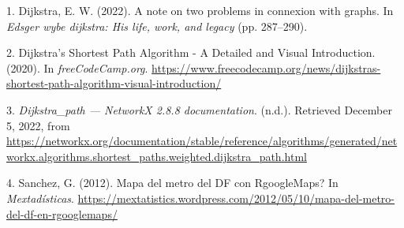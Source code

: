 \documentclass[
]{article}
\newlength{\cslhangindent}
\newlength{\cslentryspacingunit} %
\newenvironment{CSLReferences}[2] %
 {%
  \setlength{\parindent}{0pt}
  \ifodd #1
  \let\oldpar\par
  \def\par{\hangindent=\cslhangindent\oldpar}
  \fi
  \setlength{\parskip}{#2\cslentryspacingunit}
 }%
 {}
\begin{document}
\hypertarget{refs}{}
\begin{CSLReferences}{1}{0}
\leavevmode{}%
1. Dijkstra, E. W. (2022). A note on two problems in connexion with
graphs. In \emph{Edsger wybe dijkstra: His life, work, and legacy} (pp.
287--290).

\leavevmode{}%
2. Dijkstra's {Shortest} {Path} {Algorithm} - {A} {Detailed} and
{Visual} {Introduction}. (2020). In \emph{freeCodeCamp.org}.
\url{https://www.freecodecamp.org/news/dijkstras-shortest-path-algorithm-visual-introduction/}

\leavevmode{}%
3. \emph{Dijkstra\_path --- {NetworkX} 2.8.8 documentation}. (n.d.).
Retrieved December 5, 2022, from
\url{https://networkx.org/documentation/stable/reference/algorithms/generated/networkx.algorithms.shortest_paths.weighted.dijkstra_path.html}

\leavevmode{}%
4. Sanchez, G. (2012). Mapa del metro del {DF} con {RgoogleMaps}? In
\emph{Mextadísticas}.
\url{https://mextatistics.wordpress.com/2012/05/10/mapa-del-metro-del-df-en-rgooglemaps/}

\end{CSLReferences}
\end{document}
